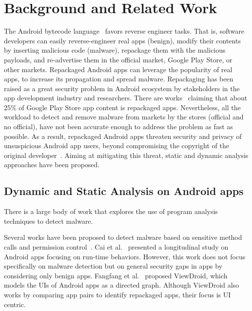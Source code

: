 \section{Background and Related Work}\label{sec:background}


The Android bytecode language~\cite{DBLP:conf/issta/WangGMC15} favors reverse engineer tasks. That is, software developers can easily reverse-engineer real apps (benign), modify their contents by inserting malicious code (malware), repackage them with the malicious payloads, and re-advertise them in the official market, Google Play Store, or other markets. Repackaged Android apps can leverage the popularity of real apps, to increase its propagation and spread malware.  
Repackaging has been raised as a great security problem in Android ecosystem by stakeholders in the app development industry and researchers. There are works~\cite{DBLP:conf/sigmetrics/ViennotGN14} claiming that about 25\% of Google Play Store app content is repackaged apps. Nevertheless, all the workload to detect and remove malware from markets by the stores (official and no official), have not been accurate enough to address the problem as fast as possible. As a result, repackaged Android apps threaten security and privacy of unsuspicious Android app users, beyond compromising the copyright of the original developer~\cite{DBLP:journals/access/KimLCP19}. Aiming at
mitigating this threat, static and dynamic analysis approaches have been proposed.

\subsection{Dynamic and Static Analysis on Android apps}\label{sec:analysis}

There is a large body of work that explores the use of program analysis techniques to detect malware. 

Several works have been proposed to detect malware based on sensitive method calls and permission control~\cite{DBLP:conf/mobicom/WeiGNF12,DBLP:conf/asiajcis/WuMWLW12,DBLP:conf/sp/LiDLDG21}. Cai et al.~\cite{DBLP:journals/tse/CaiR21} presented a longitudinal study on Android apps focusing on run-time behaviors. However, this work does not focus specifically on malware detection but on general security gaps in apps by considering only benign apps. Fangfang et al.~\cite{DBLP:conf/wisec/ZhangHZW014} proposed ViewDroid, which models the UIs of Android apps as a directed graph. Although ViewDroid also works by comparing app pairs to identify repackaged apps, their focus is UI centric.

